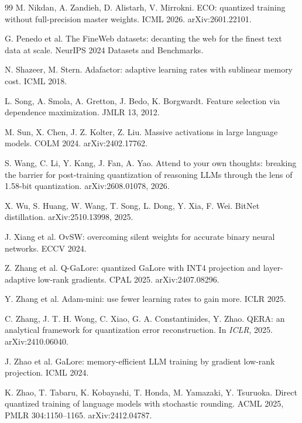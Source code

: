 \documentclass[10pt,twocolumn]{article}
\begin{document}
\begin{thebibliography}{99}
 M. Nikdan, A. Zandieh, D. Alistarh, V. Mirrokni. ECO: quantized training
  without full-precision master weights. ICML 2026. arXiv:2601.22101.

 G. Penedo et al. The FineWeb datasets: decanting the web for the finest
  text data at scale. NeurIPS 2024 Datasets and Benchmarks.

 N. Shazeer, M. Stern. Adafactor: adaptive learning rates with
  sublinear memory cost. ICML 2018.

 L. Song, A. Smola, A. Gretton, J. Bedo, K. Borgwardt. Feature selection via dependence maximization. JMLR 13, 2012.

 M. Sun, X. Chen, J. Z. Kolter, Z. Liu. Massive activations in large language
  models. COLM 2024. arXiv:2402.17762.

 S. Wang, C. Li, Y. Kang, J. Fan, A. Yao. Attend to your own thoughts: breaking
  the barrier for post-training quantization of reasoning LLMs through the lens of 1.58-bit quantization.
  arXiv:2608.01078, 2026.

 X. Wu, S. Huang, W. Wang, T. Song, L. Dong, Y. Xia, F. Wei. BitNet
  distillation. arXiv:2510.13998, 2025.

 J. Xiang et al. OvSW: overcoming silent weights for accurate binary neural
  networks. ECCV 2024.

 Z. Zhang et al. Q-GaLore: quantized GaLore with INT4 projection and
  layer-adaptive low-rank gradients. CPAL 2025. arXiv:2407.08296.

 Y. Zhang et al. Adam-mini: use fewer learning rates to gain more. ICLR
  2025.

 C. Zhang, J. T. H. Wong, C. Xiao, G. A. Constantinides, Y. Zhao. QERA:
an analytical framework for quantization error reconstruction. In \emph{ICLR}, 2025. arXiv:2410.06040.

 J. Zhao et al. GaLore: memory-efficient LLM training by gradient low-rank
  projection. ICML 2024.

 K. Zhao, T. Tabaru, K. Kobayashi, T. Honda, M. Yamazaki, Y. Tsuruoka.
  Direct quantized training of language models with stochastic rounding. ACML 2025, PMLR 304:1150--1165. arXiv:2412.04787.

\end{thebibliography}
\end{document}
